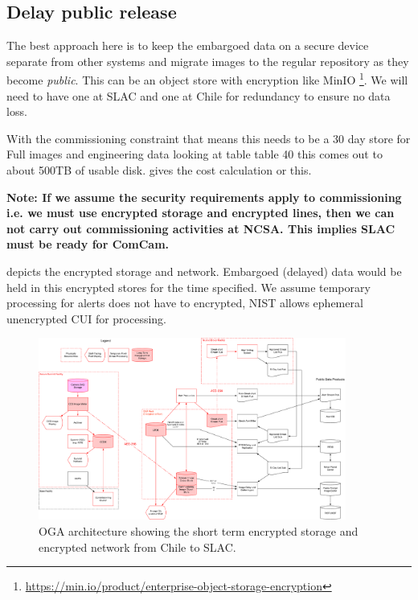 
\subsection{Delay public release} \label{sec:3delay}

The best approach here is to keep the embargoed data on a secure device separate from other systems and migrate images to the regular repository as they become \emph{public}.
This can be an object store with encryption like MinIO \footnote{\url{ https://min.io/product/enterprise-object-storage-encryption}}.
We will need to have one at SLAC and one at Chile for redundancy to ensure no data loss.

With the commissioning constraint that means this needs to be a 30 day store  for Full images and engineering data looking at 
table table 40 this comes out to about 500TB of usable disk.
 gives the cost calculation or this.




\bf{Note:} If we assume the security requirements apply to commissioning i.e. we must use encrypted storage and encrypted lines, then we can not carry out commissioning activities at NCSA. This implies SLAC must be ready for ComCam.

 depicts the encrypted storage and network. Embargoed (delayed) data would be held in this encrypted stores for the time specified.
We assume temporary processing for alerts does not have to encrypted, NIST allows ephemeral unencrypted CUI for processing.

\begin{figure}
\begin{centering}
\includegraphics[width=0.9\textwidth]{OGA_Diagram}
	\caption{ OGA architecture  showing the short term encrypted storage and encrypted network from Chile to SLAC. \label{fig:arch}}
\end{centering}
\end{figure}
